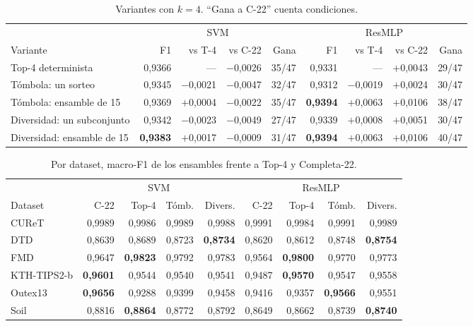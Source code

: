 \documentclass[11pt,a4paper]{article}
\newcommand{\pos}[1]{\textcolor{bien}{$+$#1}}
\newcommand{\negv}[1]{\textcolor{mal}{$-$#1}}
\begin{document}
\begin{table}[H]
\centering
\caption{Variantes con $k=4$. ``Gana a C-22'' cuenta condiciones.}
\footnotesize
\setlength{\tabcolsep}{4pt}
\begin{tabular}{@{}lrrrrrrrr@{}}
\toprule
 & \multicolumn{4}{c}{SVM} & \multicolumn{4}{c}{ResMLP} \\
\cmidrule(lr){2-5}\cmidrule(l){6-9}
Variante & F1 & vs T-4 & vs C-22 & Gana & F1 & vs T-4 & vs C-22 & Gana \\
\midrule
Top-4 determinista & 0,9366 & --- & \negv{0,0026} & 35/47 & 0,9331 & --- & \pos{0,0043} & 29/47 \\
\addlinespace
Tómbola: un sorteo & 0,9345 & \negv{0,0021} & \negv{0,0047} & 32/47 & 0,9312 & \negv{0,0019} & \pos{0,0024} & 30/47 \\
Tómbola: ensamble de 15 & 0,9369 & \pos{0,0004} & \negv{0,0022} & 35/47 & \textbf{0,9394} & \pos{0,0063} & \pos{0,0106} & 38/47 \\
\addlinespace
Diversidad: un subconjunto & 0,9342 & \negv{0,0023} & \negv{0,0049} & 27/47 & 0,9339 & \pos{0,0008} & \pos{0,0051} & 30/47 \\
Diversidad: ensamble de 15 & \textbf{0,9383} & \pos{0,0017} & \negv{0,0009} & 31/47 & \textbf{0,9394} & \pos{0,0063} & \pos{0,0106} & 40/47 \\
\bottomrule
\end{tabular}
\end{table}

\begin{table}[H]
\centering
\caption{Por dataset, macro-F1 de los ensambles frente a Top-4 y Completa-22.}
\footnotesize
\setlength{\tabcolsep}{4pt}
\begin{tabular}{@{}lrrrrrrrr@{}}
\toprule
 & \multicolumn{4}{c}{SVM} & \multicolumn{4}{c}{ResMLP} \\
\cmidrule(lr){2-5}\cmidrule(l){6-9}
Dataset & C-22 & Top-4 & Tómb. & Divers. & C-22 & Top-4 & Tómb. & Divers. \\
\midrule
CUReT & 0,9989 & 0,9986 & 0,9989 & 0,9988 & 0,9991 & 0,9984 & 0,9991 & 0,9989 \\
DTD & 0,8639 & 0,8689 & 0,8723 & \textbf{0,8734} & 0,8620 & 0,8612 & 0,8748 & \textbf{0,8754} \\
FMD & 0,9647 & \textbf{0,9823} & 0,9792 & 0,9783 & 0,9564 & \textbf{0,9800} & 0,9770 & 0,9773 \\
KTH-TIPS2-b & \textbf{0,9601} & 0,9544 & 0,9540 & 0,9541 & 0,9487 & \textbf{0,9570} & 0,9547 & 0,9558 \\
Outex13 & \textbf{0,9656} & 0,9288 & 0,9399 & 0,9458 & 0,9416 & 0,9357 & \textbf{0,9566} & 0,9551 \\
Soil & 0,8816 & \textbf{0,8864} & 0,8772 & 0,8792 & 0,8649 & 0,8662 & 0,8739 & \textbf{0,8740} \\
\bottomrule
\end{tabular}
\end{table}
\end{document}
